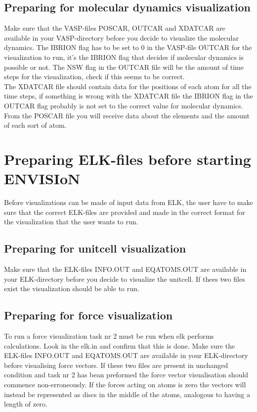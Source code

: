 \subsection{Preparing for molecular dynamics visualization}
Make sure that the VASP-files POSCAR, OUTCAR and XDATCAR are available in your VASP-directory before you decide to visualize the molecular dynamics. The IBRION flag has to be set to 0 in the VASP-file OUTCAR for the visualization to run, it's the IBRION flag that decides if  molecular dynamics is possible or not. The NSW flag in the OUTCAR file will be the amount of time steps for the visualization, check if this seems to be correct. \\

The XDATCAR file should contain data for the positions of each atom for all the time steps, if something is wrong with the XDATCAR file the IBRION flag in the OUTCAR flag probably is not set to the correct value for molecular dynamics. From the POSCAR file you will receive data about the elements and the amount of each sort of atom.   

\newpage

\section{Preparing ELK-files before starting ENVISIoN}
Before visualizations can be made of input data from ELK, the user have to make sure that the correct ELK-files are provided and made in the correct format for the visualization that the user wants to run.

\subsection{Preparing for unitcell visualization}

Make sure that the ELK-files INFO.OUT and EQATOMS.OUT are available in your ELK-directory before you decide to visualize the unitcell. If thees two files exist the visualization should be able to run.  

\subsection{Preparing for force visualization}

To run a force visualization task nr 2 must be run when elk performs calculations. Look in the elk.in and confirm that this is done. Make sure the ELK-files INFO.OUT and EQATOMS.OUT are available in your ELK-directory before visualising force vectors. If these two files are present in unchanged condition and task nr 2 has bean preformed the force vector visualisation should commence non-erroneously. If the forces acting on atoms is zero the vectors will instead be represented as discs in the middle of the atoms, analogous to having a length of zero. 

